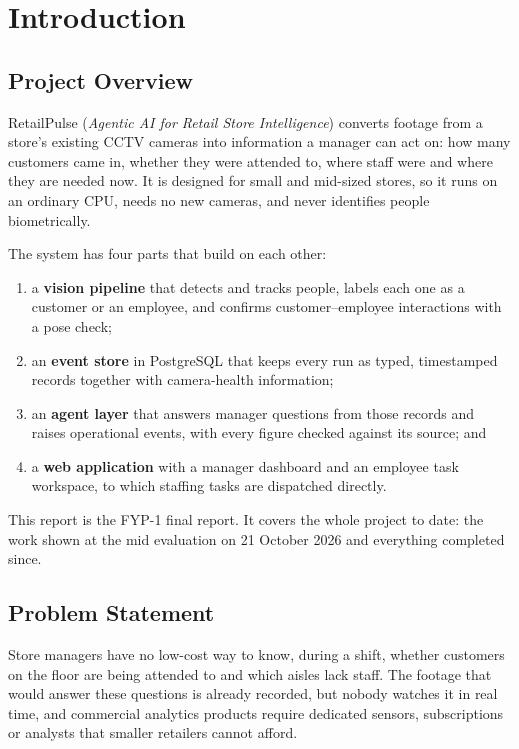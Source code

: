 \chapter{Introduction}
\label{ch:intro}

\section{Project Overview}
RetailPulse (\textit{Agentic AI for Retail Store Intelligence}) converts footage from a store's existing CCTV cameras into information a manager can act on: how many customers came in, whether they were attended to, where staff were and where they are needed now. It is designed for small and mid-sized stores, so it runs on an ordinary CPU, needs no new cameras, and never identifies people biometrically.

The system has four parts that build on each other:
\begin{enumerate}
\item a \textbf{vision pipeline} that detects and tracks people, labels each one as a customer or an employee, and confirms customer--employee interactions with a pose check;
\item an \textbf{event store} in PostgreSQL that keeps every run as typed, timestamped records together with camera-health information;
\item an \textbf{agent layer} that answers manager questions from those records and raises operational events, with every figure checked against its source; and
\item a \textbf{web application} with a manager dashboard and an employee task workspace, to which staffing tasks are dispatched directly.
\end{enumerate}

This report is the FYP-1 final report. It covers the whole project to date: the work shown at the mid evaluation on 21 October 2026 and everything completed since.

\section{Problem Statement}
Store managers have no low-cost way to know, during a shift, whether customers on the floor are being attended to and which aisles lack staff. The footage that would answer these questions is already recorded, but nobody watches it in real time, and commercial analytics products require dedicated sensors, subscriptions or analysts that smaller retailers cannot afford.


